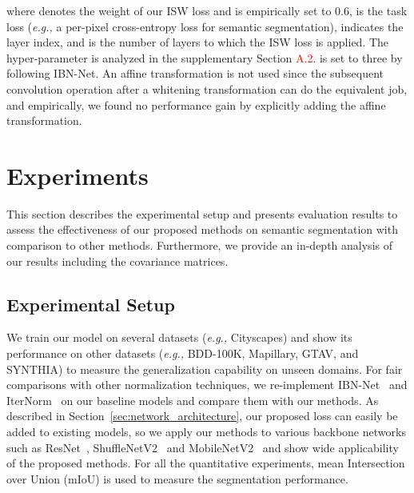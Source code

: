 \documentclass[final]{latex/cvpr}
\newcommand{\todow}[1]{\textcolor{red}{#1}}
\begin{document}
where  denotes the weight of our ISW loss and is empirically set to 0.6,  is the task loss (\textit{e.g.,} a per-pixel cross-entropy loss for semantic segmentation),  indicates the layer index, and  is the number of layers to which the ISW loss is applied. The hyper-parameter  is analyzed in the supplementary Section \todow{A.2}.  is set to three by following IBN-Net.
An affine transformation is not used since the subsequent convolution operation after a whitening transformation can do the equivalent job, and empirically, we found no performance gain by explicitly adding the affine transformation.
\vspace{-0.1cm}










\vspace{-0.0cm}
\section{Experiments}
\vspace{-0.1cm}
This section describes the experimental setup and presents evaluation results to assess the effectiveness of our proposed methods on semantic segmentation with comparison to other methods. Furthermore, we provide an in-depth analysis of our results including the covariance matrices.
\vspace{-0.07cm}
\subsection{Experimental Setup}
\vspace{-0.08cm}
We train our model on several datasets (\textit{e.g.,} Cityscapes) and show its performance on other datasets (\textit{e.g.,} BDD-100K, Mapillary, GTAV, and SYNTHIA) to measure the generalization capability on unseen domains.
For fair comparisons with other normalization techniques, we re-implement IBN-Net~\cite{pan2018two} and IterNorm~\cite{huang2019iterative} on our baseline models and compare them with our methods.
As described in Section~\ref{sec:network_architecture}, our proposed loss can easily be added to existing models, so we apply our methods to various backbone networks such as 
ResNet~\cite{he2016deep}, ShuffleNetV2~\cite{ma2018shufflenet} and MobileNetV2~\cite{sandler2018mobilenetv2} and show wide applicability of the proposed methods.
For all the quantitative experiments, mean Intersection over Union (mIoU) is used to measure the segmentation performance.
\vspace{-0.4cm}
\end{document}
